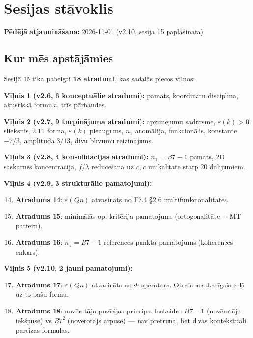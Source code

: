 \documentclass[12pt,a4paper]{article}
\begin{document}
\newpage

\section{Sesijas stāvoklis}
\label{sec:sesijas-stavoklis}

\textbf{Pēdējā atjaunināšana:} 2026-11-01 (v2.10, sesija 15 paplašināta)

\subsection*{Kur mēs apstājāmies}

Sesijā 15 tika pabeigti \textbf{18 atradumi}, kas sadalās piecos viļņos:

\textbf{Viļnis 1 (v2.6, 6 konceptuālie atradumi):} pamats, koordinātu disciplīna, akustiskā formula, trīs pārbaudes.

\textbf{Viļnis 2 (v2.7, 9 turpinājuma atradumi):} apzīmējumu sadursme, $\varepsilon(k)>0$ slieksnis, 2.11 forma, $\varepsilon(k)$ pieaugums, $n_1$ anomālija, funkcionālis, konstante $-7/3$, amplitūda $3/13$, divu blīvumu reizinājums.

\textbf{Viļnis 3 (v2.8, 4 konsolidācijas atradumi):} $n_1=B7-1$ pamats, 2D saskarnes koncentrācija, $f/\lambda$ reducēšana uz $c$, $c$ unikalitāte starp 20 dalījumiem.

\textbf{Viļnis 4 (v2.9, 3 strukturālie pamatojumi):}
\begin{enumerate}
    \setcounter{enumi}{13}
    \item \textbf{Atradums 14}: $\varepsilon(Qn)$ atvasināts no F3.4 §2.6 multifunkcionalitātes.
    \item \textbf{Atradums 15}: minimālās op. kritērija pamatojums (ortogonalitāte + MT pattern).
    \item \textbf{Atradums 16}: $n_1 = B7-1$ references punkta pamatojums (koherences enkurs).
\end{enumerate}

\textbf{Viļnis 5 (v2.10, 2 jauni pamatojumi):}
\begin{enumerate}
    \setcounter{enumi}{16}
    \item \textbf{Atradums 17}: $\varepsilon(Qn)$ atvasināts no $\Phi$ operatora. Otrais neatkarīgais ceļš uz to pašu formu.
    \item \textbf{Atradums 18}: novērotāja pozīcijas princips. Izskaidro $B7-1$ (novērotājs iekšpusē) vs $B7^2$ (novērotājs ārpusē) — nav pretruna, bet divas kontekstuāli pareizas formulas.
\end{enumerate}
\end{document}
